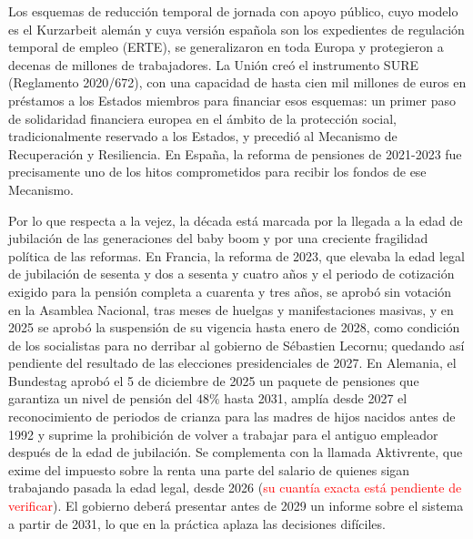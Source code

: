 \documentclass[10pt,a4paper]{article}
\begin{document}
Los esquemas de reducción temporal de jornada con apoyo público, cuyo modelo es el Kurzarbeit alemán y cuya versión española son los expedientes de regulación temporal de empleo (ERTE), se generalizaron en toda Europa y protegieron a decenas de millones de trabajadores. La Unión creó el instrumento SURE (Reglamento 2020/672), con una capacidad de hasta cien mil millones de euros en préstamos a los Estados miembros para financiar esos esquemas: un primer paso de solidaridad financiera europea en el ámbito de la protección social, tradicionalmente reservado a los Estados, y precedió al Mecanismo de Recuperación y Resiliencia. En España, la reforma de pensiones de 2021-2023 fue precisamente uno de los hitos comprometidos para recibir los fondos de ese Mecanismo.

Por lo que respecta a la vejez, la década está marcada por la llegada a la edad de jubilación de las generaciones del baby boom y por una creciente fragilidad política de las reformas. En Francia, la reforma de 2023, que elevaba la edad legal de jubilación de sesenta y dos a sesenta y cuatro años y el periodo de cotización exigido para la pensión completa a cuarenta y tres años, se aprobó sin votación en la Asamblea Nacional, tras meses de huelgas y manifestaciones masivas, y en 2025 se aprobó la suspensión de su vigencia hasta enero de 2028, como condición de los socialistas para no derribar al gobierno de Sébastien Lecornu; quedando así pendiente del resultado de las elecciones presidenciales de 2027. En Alemania, el Bundestag aprobó el 5 de diciembre de 2025 un paquete de pensiones que garantiza un nivel de pensión del $48\%$ hasta 2031, amplía desde 2027 el reconocimiento de periodos de crianza para las madres de hijos nacidos antes de 1992 y suprime la prohibición de volver a trabajar para el antiguo empleador después de la edad de jubilación. Se complementa con la llamada Aktivrente, que exime del impuesto sobre la renta una parte del salario de quienes sigan trabajando pasada la edad legal, desde 2026 (\textcolor{red}{su cuantía exacta está pendiente de verificar}). El gobierno deberá presentar antes de 2029 un informe sobre el sistema a partir de 2031, lo que en la práctica aplaza las decisiones difíciles.
\end{document}
